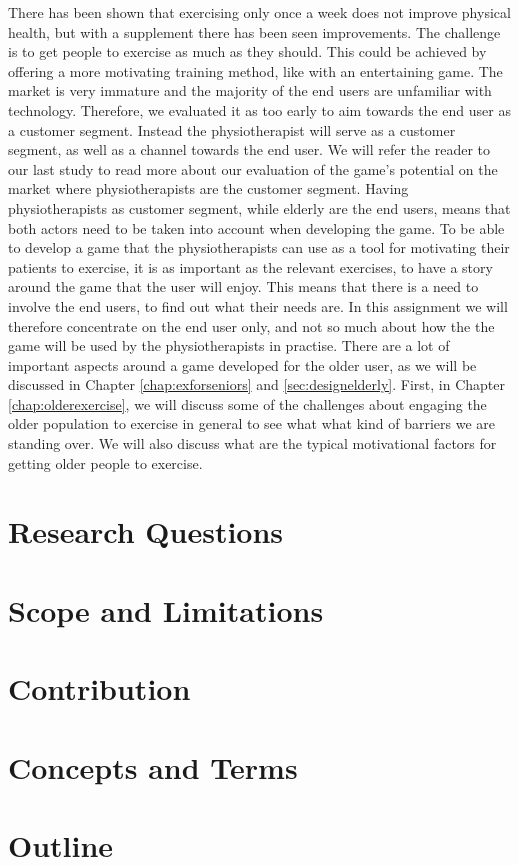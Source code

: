 There has been shown that exercising only once a week does not improve physical health, but with a supplement there has been seen improvements. The challenge is to get people to exercise as much as they should. This could be achieved by offering a more motivating training method, like with an entertaining game. The market is very immature and the majority of the  end users are unfamiliar with technology. Therefore, we evaluated it as too early to aim towards the end user as a customer segment. Instead the physiotherapist will serve as a customer segment, as well as a channel towards the end user. We will refer the reader to our last study \cite{project} to read more about our evaluation of the game's potential on the market where physiotherapists are the customer segment. Having physiotherapists as customer segment, while elderly are the end users, means that both actors need to be taken into account when developing the game. To be able to develop a game that the physiotherapists can use as a tool for motivating their patients to exercise, it is as important as the relevant exercises, to have a story around the game that the user will enjoy. This means that there is a need to involve the end users, to find out what their needs are. In this assignment we will therefore concentrate on the end user only, and not so much about how the the game will be used by the physiotherapists in practise. There are a lot of important aspects around a game developed for the older user, as we will be discussed in Chapter \ref{chap:exforseniors} and \ref{sec:designelderly}. First, in Chapter \ref{chap:olderexercise}, we will discuss some of the challenges about engaging the older population to exercise in general to see what what kind of barriers we are standing over. We will also discuss what are the typical motivational factors for getting older people to exercise.  

\section{Research Questions}
\label{sec:researchq}

\section{Scope and Limitations}

\section{Contribution}

\section{Concepts and Terms}

\section{Outline}